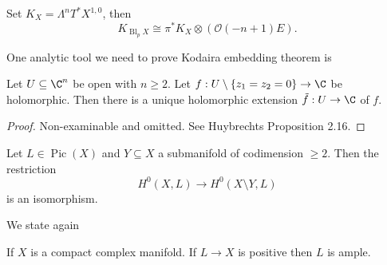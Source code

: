 \documentclass[a4paper]{article}
\DeclareMathOperator{\Pic}{Pic} %
\DeclareMathOperator{\Bl}{Bl} %
\begin{document}
\begin{ex}
  Set \(K_X = \Lambda^n T^*X^{1, 0}\), then
  \[
    K_{\Bl_p X} \cong \pi^* K_X \otimes (\mathcal O(-n + 1)E).
  \]
\end{ex}

One analytic tool we need to prove Kodaira embedding theorem is
\begin{theorem}
  Let \(U \subseteq \C^n\) be open with \(n \geq 2\). Let \(f: U \setminus \{z_1 = z_2 = 0\} \to \C\) be holomorphic. Then there is a unique holomorphic extension \(\tilde f: U \to \C\) of \(f\).
\end{theorem}

\begin{proof}
  Non-examinable and omitted. See Huybrechts Proposition 2.16.
\end{proof}

\begin{ex}
  Let \(L \in \Pic(X)\) and \(Y \subseteq X\) a submanifold of codimension \(\geq 2\). Then the restriction
  \[
    H^0(X, L) \to H^0(X \setminus Y, L)
  \]
  is an isomorphism.
\end{ex}

We state again
\begin{theorem}
  If \(X\) is a compact complex manifold. If \(L \to X\) is positive then \(L\) is ample.
\end{theorem}
\end{document}
